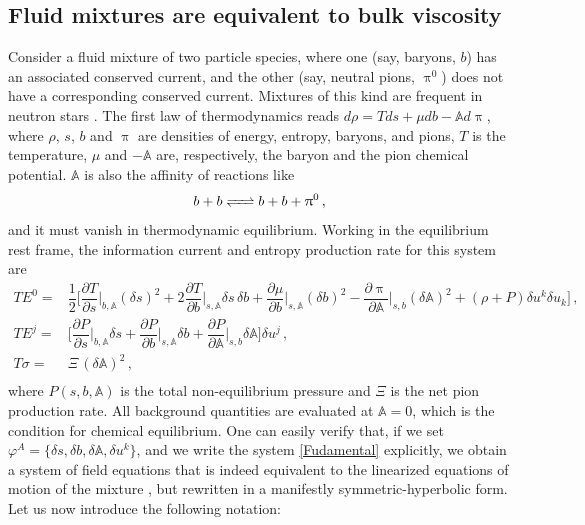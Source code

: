 \documentclass[a4paper, amsfonts, amssymb, amsmath, reprint, showkeys, nofootinbib, twoside, onecolumn,notitlepage]{revtex4-1}
\begin{document}
\subsection{Fluid mixtures are equivalent to bulk viscosity} 

Consider a fluid mixture of two particle species, where one (say, baryons, $b$) has an associated conserved current, and the other (say, neutral pions, $\uppi^0$) does not have a corresponding conserved current. Mixtures of this kind are frequent in neutron stars \cite{Migdal1973,Suzuki1973,Haensel1982,
CamelioSimulations2022}. The first law of thermodynamics reads $d\rho= Tds+\mu db-\mathbb{A}d\uppi$, where $\rho$, $s$, $b$ and $\uppi$ are densities of energy, entropy, baryons, and pions, $T$ is the temperature, $\mu$ and $-\mathbb{A}$ are,  respectively, the baryon and the pion chemical potential. $\mathbb{A}$ is also the affinity \cite{PrigoginebookModernThermodynamics2014} of reactions like
\begin{equation}
b+b \ce{ <=> } b+b+\uppi^0 \, ,
\end{equation}
and it must vanish in thermodynamic equilibrium. Working in the equilibrium rest frame, the information current and entropy production rate for this system are \cite{GavassinoGibbs2021} 
\begin{equation}\label{infochemical}
\begin{split}
TE^0 ={}& \dfrac{1}{2} \bigg[\dfrac{\partial T}{\partial s}\bigg|_{b,\mathbb{A}} \! \! \! (\delta s)^2 + 2 \dfrac{\partial T}{\partial b}\bigg|_{s,\mathbb{A}} \! \! \! \delta s \, \delta b + \dfrac{\partial \mu}{\partial b}\bigg|_{s,\mathbb{A}} \! \! \!(\delta b)^2  -\dfrac{\partial \uppi}{\partial \mathbb{A}}\bigg|_{s,b} (\delta \mathbb{A})^2 + (\rho+P) \delta u^k \delta u_k  \bigg] \, , \\
TE^j ={}& \bigg[  \dfrac{\partial P}{\partial s}\bigg|_{b,\mathbb{A}} \delta s+ \dfrac{\partial P}{\partial b}\bigg|_{s,\mathbb{A}} \delta b+ \dfrac{\partial P}{\partial \mathbb{A}}\bigg|_{s,b} \delta \mathbb{A} \bigg] \delta u^j \, , \\
T\sigma ={}& \Xi \, (\delta \mathbb{A})^2 \, , \\
\end{split}
\end{equation}
where $P(s,b,\mathbb{A})$ is the total non-equilibrium pressure and $\Xi$ is the net pion production rate. All background quantities are evaluated at $\mathbb{A}=0$, which is the condition for chemical equilibrium. One can easily verify that, if we set $\varphi^A=\{\delta s, \delta b, \delta \mathbb{A}, \delta u^k \}$, and we write the system \eqref{Fudamental} explicitly, we obtain a system of field equations that is indeed equivalent to the linearized equations of motion of the mixture \cite{BulkGavassino}, but rewritten in a manifestly symmetric-hyperbolic form. Let us now introduce the following notation:
\end{document}
